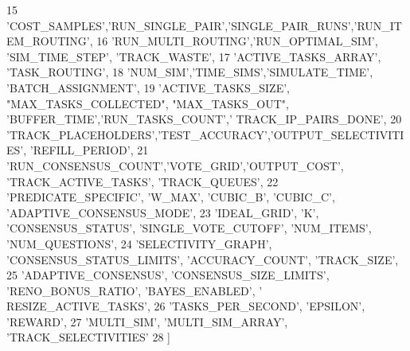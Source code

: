 \begin{DoxyCode}
15             \textcolor{stringliteral}{'COST\_SAMPLES'},\textcolor{stringliteral}{'RUN\_SINGLE\_PAIR'},\textcolor{stringliteral}{'SINGLE\_PAIR\_RUNS'},\textcolor{stringliteral}{'RUN\_ITEM\_ROUTING'},
16             \textcolor{stringliteral}{'RUN\_MULTI\_ROUTING'},\textcolor{stringliteral}{'RUN\_OPTIMAL\_SIM'}, \textcolor{stringliteral}{'SIM\_TIME\_STEP'}, \textcolor{stringliteral}{'TRACK\_WASTE'}, 
17             \textcolor{stringliteral}{'ACTIVE\_TASKS\_ARRAY'}, \textcolor{stringliteral}{'TASK\_ROUTING'},
18             \textcolor{stringliteral}{'NUM\_SIM'},\textcolor{stringliteral}{'TIME\_SIMS'},\textcolor{stringliteral}{'SIMULATE\_TIME'}, \textcolor{stringliteral}{'BATCH\_ASSIGNMENT'},
19             \textcolor{stringliteral}{'ACTIVE\_TASKS\_SIZE'}, \textcolor{stringliteral}{"MAX\_TASKS\_COLLECTED"}, \textcolor{stringliteral}{"MAX\_TASKS\_OUT"}, \textcolor{stringliteral}{'BUFFER\_TIME'},\textcolor{stringliteral}{'RUN\_TASKS\_COUNT'},\textcolor{stringliteral}{'
      TRACK\_IP\_PAIRS\_DONE'},
20             \textcolor{stringliteral}{'TRACK\_PLACEHOLDERS'},\textcolor{stringliteral}{'TEST\_ACCURACY'},\textcolor{stringliteral}{'OUTPUT\_SELECTIVITIES'}, \textcolor{stringliteral}{'REFILL\_PERIOD'},
21             \textcolor{stringliteral}{'RUN\_CONSENSUS\_COUNT'},\textcolor{stringliteral}{'VOTE\_GRID'},\textcolor{stringliteral}{'OUTPUT\_COST'}, \textcolor{stringliteral}{'TRACK\_ACTIVE\_TASKS'}, \textcolor{stringliteral}{'TRACK\_QUEUES'},
22             \textcolor{stringliteral}{'PREDICATE\_SPECIFIC'}, \textcolor{stringliteral}{'W\_MAX'}, \textcolor{stringliteral}{'CUBIC\_B'}, \textcolor{stringliteral}{'CUBIC\_C'}, \textcolor{stringliteral}{'ADAPTIVE\_CONSENSUS\_MODE'},
23             \textcolor{stringliteral}{'IDEAL\_GRID'}, \textcolor{stringliteral}{'K'}, \textcolor{stringliteral}{'CONSENSUS\_STATUS'}, \textcolor{stringliteral}{'SINGLE\_VOTE\_CUTOFF'}, \textcolor{stringliteral}{'NUM\_ITEMS'}, \textcolor{stringliteral}{'NUM\_QUESTIONS'},
24             \textcolor{stringliteral}{'SELECTIVITY\_GRAPH'}, \textcolor{stringliteral}{'CONSENSUS\_STATUS\_LIMITS'}, \textcolor{stringliteral}{'ACCURACY\_COUNT'}, \textcolor{stringliteral}{'TRACK\_SIZE'},
25             \textcolor{stringliteral}{'ADAPTIVE\_CONSENSUS'}, \textcolor{stringliteral}{'CONSENSUS\_SIZE\_LIMITS'}, \textcolor{stringliteral}{'RENO\_BONUS\_RATIO'}, \textcolor{stringliteral}{'BAYES\_ENABLED'}, \textcolor{stringliteral}{'
      RESIZE\_ACTIVE\_TASKS'},
26             \textcolor{stringliteral}{'TASKS\_PER\_SECOND'}, \textcolor{stringliteral}{'EPSILON'}, \textcolor{stringliteral}{'REWARD'},
27             \textcolor{stringliteral}{'MULTI\_SIM'}, \textcolor{stringliteral}{'MULTI\_SIM\_ARRAY'}, \textcolor{stringliteral}{'TRACK\_SELECTIVITIES'}
28 ]
\end{DoxyCode}


